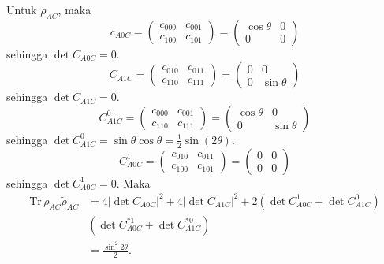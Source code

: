 Untuk $\rho_{AC}$, maka
\begin{equation}
	c_{A0C}=
	\begin{pmatrix}
		c_{000} & c_{001} \\
		c_{100} & c_{101}
	\end{pmatrix}=
	\begin{pmatrix}
		\cos\theta & 0 \\
		0 & 0
	\end{pmatrix}
\end{equation}
sehingga $\det C_{A0C} = 0$.
\begin{equation}
	C_{A1C}=
	\begin{pmatrix}
		c_{010} & c_{011} \\
		c_{110} & c_{111}
	\end{pmatrix}=
	\begin{pmatrix}
		0 & 0 \\
		0 & \sin\theta
	\end{pmatrix}
\end{equation}
sehingga $\det C_{A1C} = 0$.
\begin{equation}
	C_{A1C}^0=
	\begin{pmatrix}
		c_{000} & c_{001} \\
		c_{110} & c_{111}
	\end{pmatrix}=
	\begin{pmatrix}
		\cos\theta & 0 \\
		0 & \sin\theta
	\end{pmatrix}
\end{equation}
sehingga $\det C_{A1C}^0 = \sin\theta \cos\theta = \frac{1}{2}\sin(2\theta)$.
\begin{equation}
	C_{A0C}^1=
	\begin{pmatrix}
		c_{010} & c_{011} \\
		c_{100} & c_{101}
	\end{pmatrix}=
	\begin{pmatrix}
		0 & 0 \\
		0 & 0
	\end{pmatrix}
\end{equation}
sehingga $\det C_{A0C}^1 = 0$. Maka
\begin{equation}
	\begin{aligned}
		\mathrm{Tr}\,\rho_{AC}\tilde{\rho}_{AC}
		&=4 |\det C_{A0C}|^2+ 4 |\det C_{A1C}|^2+ 2 (\det C_{A0C}^1 + \det C_{A1C}^0)\\
		&(\det C^{*1}_{A0C} + \det C^{*0}_{A1C})\\
		&=\frac{\sin^2 2\theta}{2}.
	\end{aligned}
\end{equation}
